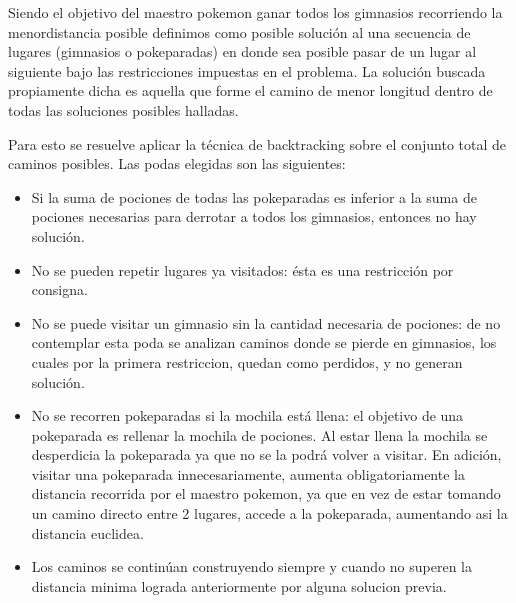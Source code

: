Siendo el objetivo del maestro pokemon ganar todos los gimnasios recorriendo la menordistancia posible definimos como posible solución al una secuencia de lugares (gimnasios o pokeparadas) en donde sea posible pasar de un lugar al siguiente bajo las restricciones impuestas en el problema. La solución buscada propiamente dicha es aquella que forme el camino de menor longitud dentro de todas las soluciones posibles halladas.

Para esto se resuelve aplicar la técnica de backtracking sobre el conjunto total de caminos posibles. Las podas elegidas son las siguientes:

\begin{itemize}
\item Si la suma de pociones de todas las pokeparadas es inferior a la suma de pociones necesarias para derrotar a todos los gimnasios, entonces no hay solución.
\item No se pueden repetir lugares ya visitados: ésta es una restricción por consigna.
\item No se puede visitar un gimnasio sin la cantidad necesaria de pociones: de no contemplar esta poda se analizan caminos donde se pierde en gimnasios, los cuales por la primera restriccion, quedan como perdidos, y no generan solución.
\item No se recorren pokeparadas si la mochila está llena: el objetivo de una pokeparada es rellenar la mochila de pociones. Al estar llena la mochila se desperdicia la pokeparada ya que no se la podrá volver a visitar. En adición, visitar una pokeparada innecesariamente, aumenta obligatoriamente la distancia recorrida por el maestro pokemon, ya que en vez de estar tomando un camino directo entre 2 lugares, accede a la pokeparada, aumentando asi la distancia euclidea.
\item Los caminos se continúan construyendo siempre y cuando no superen la distancia minima lograda anteriormente por alguna solucion previa.

\end{itemize}